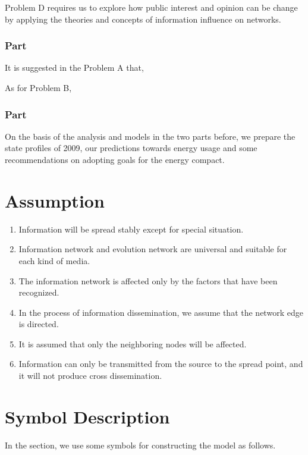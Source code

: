 \documentclass[a4paper,11pt]{article}
\begin{document}
\par Problem D requires us to explore how public interest and opinion can be change by applying the theories and concepts of information influence on networks. 

\subsubsection{Part \uppercase\expandafter{}}
\par It is suggested in the Problem A that,

\par As for Problem B, 

\subsubsection{Part \uppercase\expandafter{}}
\par On the basis of the analysis and models in the two parts before, we prepare the state profiles of 2009, our predictions towards energy usage and some recommendations on adopting goals for the energy compact.


\section{Assumption}
\begin{enumerate}%
\renewcommand{\labelenumi}{(\theenumi)}
    \item Information will be spread stably except for special situation.
    \item Information network and evolution network are universal and suitable for each kind of media.
    \item The information network is affected  only by the factors that have been recognized.
    \item In the process of information dissemination, we assume that the network edge is directed.
    \item It is assumed that only the neighboring nodes will be affected.
    \item Information can only be transmitted from the source to the spread point, and it will not produce cross dissemination.
\end{enumerate}



\section{Symbol Description}
In the section, we use some symbols for constructing the model as follows.
\end{document}

